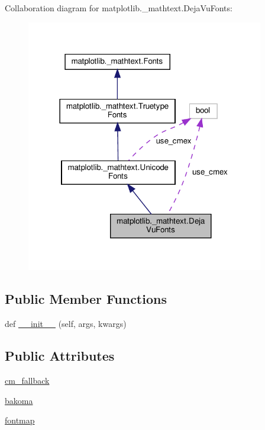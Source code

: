 Collaboration diagram for matplotlib.\+\_\+mathtext.\+Deja\+Vu\+Fonts\+:
\nopagebreak
\begin{figure}[H]
\begin{center}
\leavevmode
\includegraphics[width=294pt]{classmatplotlib_1_1__mathtext_1_1DejaVuFonts__coll__graph}
\end{center}
\end{figure}
\subsection*{Public Member Functions}
\begin{DoxyCompactItemize}
\item 
def \hyperlink{classmatplotlib_1_1__mathtext_1_1DejaVuFonts_aa5577036195642dc184d3810926d9cc0}{\+\_\+\+\_\+init\+\_\+\+\_\+} (self, args, kwargs)
\end{DoxyCompactItemize}
\subsection*{Public Attributes}
\begin{DoxyCompactItemize}
\item 
\hyperlink{classmatplotlib_1_1__mathtext_1_1DejaVuFonts_a5335d24eb4768354a49795c6d191784c}{cm\+\_\+fallback}
\item 
\hyperlink{classmatplotlib_1_1__mathtext_1_1DejaVuFonts_a4563849462a3f7606f6e2c35764695fd}{bakoma}
\item 
\hyperlink{classmatplotlib_1_1__mathtext_1_1DejaVuFonts_ad969e613de25f8630ce2265ce60d8bc3}{fontmap}
\end{DoxyCompactItemize}
